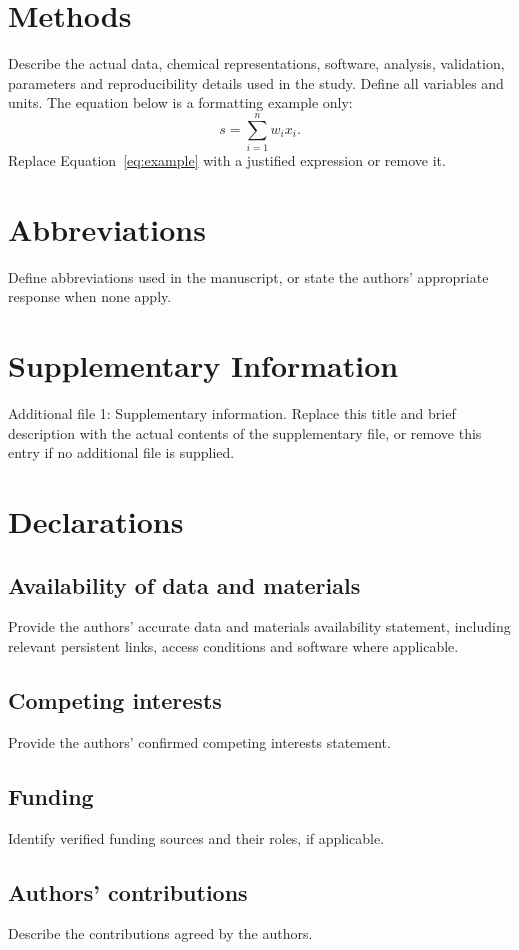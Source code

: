 \documentclass[11pt]{article}
\begin{document}
\section{Methods}\label{sec:methods}
Describe the actual data, chemical representations, software, analysis,
validation, parameters and reproducibility details used in the study. Define
all variables and units. The equation below is a formatting example only:
\begin{equation}\label{eq:example}
s = \sum_{i=1}^{n} w_i x_i.
\end{equation}
Replace Equation~\eqref{eq:example} with a justified expression or remove it.

\section*{Abbreviations}
Define abbreviations used in the manuscript, or state the authors' appropriate
response when none apply.

\section*{Supplementary Information}
Additional file 1: Supplementary information. Replace this title and brief
description with the actual contents of the supplementary file, or remove
this entry if no additional file is supplied.

\section*{Declarations}
\subsection*{Availability of data and materials}
Provide the authors' accurate data and materials availability statement,
including relevant persistent links, access conditions and software where applicable.
\subsection*{Competing interests}
Provide the authors' confirmed competing interests statement.
\subsection*{Funding}
Identify verified funding sources and their roles, if applicable.
\subsection*{Authors' contributions}
Describe the contributions agreed by the authors.
\end{document}
